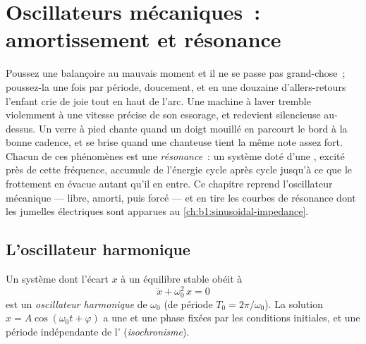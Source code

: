 \chapter{Oscillateurs mécaniques~: amortissement et résonance}\label{ch:b1:oscillators-resonance}

Poussez une balançoire au mauvais moment et il ne se passe pas
grand-chose~; poussez-la une fois par période, doucement, et en une
douzaine d'allers-retours l'enfant crie de joie tout en haut de l'arc.
Une machine à laver tremble violemment à une vitesse précise de son
essorage, et redevient silencieuse au-dessus. Un verre à pied chante
quand un doigt mouillé en parcourt le bord à la bonne cadence, et se
brise quand une chanteuse tient la même note assez fort. Chacun de ces
phénomènes est une \emph{résonance}~: un système doté d'une , excité près de cette fréquence, accumule de l'énergie cycle
après cycle jusqu'à ce que le frottement en évacue autant qu'il en
entre. Ce chapitre reprend l'oscillateur mécanique --- libre, amorti,
puis forcé --- et en tire les courbes de résonance dont les jumelles
électriques sont apparues au \cref{ch:b1:sinusoidal-impedance}.

\section{L'oscillateur harmonique}

\begin{definition}\label{def:b1:oscillators-resonance:harmonic}
Un système dont l'écart $x$ à un équilibre stable obéit à
\[
\ddot x + \omega_0^2\,x = 0
\]
est un \emph{oscillateur harmonique} de \emph{}
$\omega_0$ (de période $T_0 = 2\pi/\omega_0$). La solution $x = A\cos(\omega_0t
+ \varphi)$ a une  et une phase fixées par les conditions
initiales, et une période indépendante de l'
(\emph{isochronisme}).
\end{definition}

